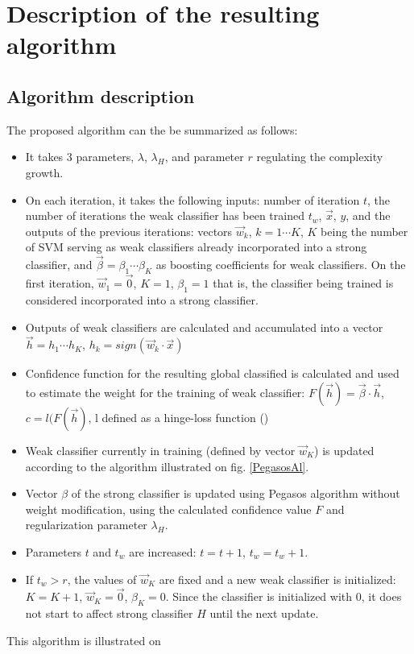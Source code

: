 \section{Description of the resulting algorithm}
\subsection {Algorithm description}
The proposed algorithm  can the be summarized as follows: 
\begin{itemize}
\item It takes 3 parameters, $\lambda$, $\lambda_H$, and parameter $r$ regulating the complexity growth.
\item On each iteration, it takes the following inputs: number of iteration $t$, the number of iterations the weak classifier has been trained $t_w$, $\vec{x}$, $y$, and the outputs of the previous iterations: vectors $\vec{w}_k$, $k=1\cdots K$, $K$ being the number of SVM serving as weak classifiers already incorporated into a strong classifier, and $\vec{\beta}=\beta_1 \cdots\beta_K$ as boosting coefficients for weak classifiers.  On the first iteration, $\vec{w}_1=\vec{0}$, $K=1$, $\beta_1=1$ that is, the classifier being trained is considered incorporated into a strong classifier. 
\item Outputs of weak classifiers are calculated and accumulated into a vector $\vec{h}=h_1\cdots h_K$, $h_k=sign(\vec{w}_k\cdot \vec{x})$ 
\item Confidence function for the resulting global classified is calculated and used to estimate the weight for the training of weak classifier: $F(\vec{h})=\vec{\beta}\cdot \vec{h}$, $c=l(F(\vec{h})$, l defined as a hinge-loss function ()
\item Weak classifier currently in training (defined by vector $\vec{w}_K$) is updated according to the algorithm illustrated on fig. \ref{PegasosAl}.
\item Vector $\beta$ of the strong classifier is updated using Pegasos algorithm without weight modification, using the calculated confidence value $F$ and regularization parameter $\lambda_H$.
\item Parameters $t$ and $t_w$ are increased: $t=t+1$, $t_w=t_w+1$. 
\item If $t_w>r$, the values of $\vec{w}_K$ are fixed and a new weak classifier is initialized: $K=K+1$, $\vec{w}_K=\vec{0}$,  $\beta_K=0$. Since the classifier is initialized with $0$, it does not start to affect strong classifier $H$ until the next update.
\end{itemize}
This algorithm is illustrated on 

